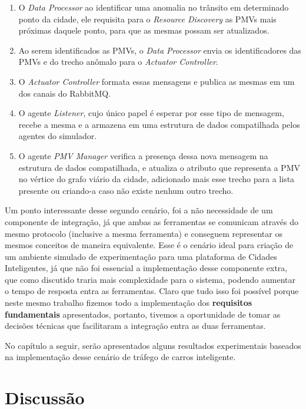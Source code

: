 \begin{enumerate}
    \item O \textit{Data Processor} ao identificar uma anomalia no trânsito em determinado ponto da cidade, ele requisita para o \textit{Resource Discovery} as PMVs mais próximas
        daquele ponto, para que as mesmas possam ser atualizados.

    \item Ao serem identificados as PMVs, o \textit{Data Processor} envia os identificadores das PMVs e do trecho anômalo para o \textit{Actuator Controller}.

    \item O \textit{Actuator Controller} formata essas mensagens e publica as mesmas em um dos canais do RabbitMQ.

    \item O agente \textit{Listener}, cujo único papel é esperar por esse tipo de mensagem, recebe a mesma e a armazena em uma estrutura de dados compatilhada pelos agentes do simulador.

    \item O agente \textit{PMV Manager} verifica a presença dessa nova mensagem na estrutura de dados compatilhada, e atualiza o atributo que representa a PMV no vértice do grafo
        viário da cidade, adicionado mais esse trecho para a lista presente ou criando-a caso não existe nenhum outro trecho.
\end{enumerate}

Um ponto interessante desse segundo cenário, foi a não necessidade de um componente de integração, já que ambas as ferramentas se comunicam através do mesmo protocolo (inclusive a
mesma ferramenta) e conseguem representar os mesmos conceitos de maneira equivalente.
Esse é o cenário ideal para criação de um ambiente simulado de experimentação para uma plataforma de Cidades Inteligentes, já que não foi essencial a implementação desse
componente extra, que como discutido traria mais complexidade para o sistema, podendo aumentar o tempo de resposta entra as ferramentas.
Claro que tudo isso foi possível porque neste mesmo trabalho fizemos todo a implementação dos \textbf{requisitos fundamentais} apresentados, portanto,
tivemos a oportunidade de tomar as decisões técnicas que facilitaram a integração entra as duas ferramentas.

No capítulo a seguir, serão apresentados alguns resultados experimentais baseados na implementação desse cenário de tráfego de carros inteligente.

\section{Discussão}

